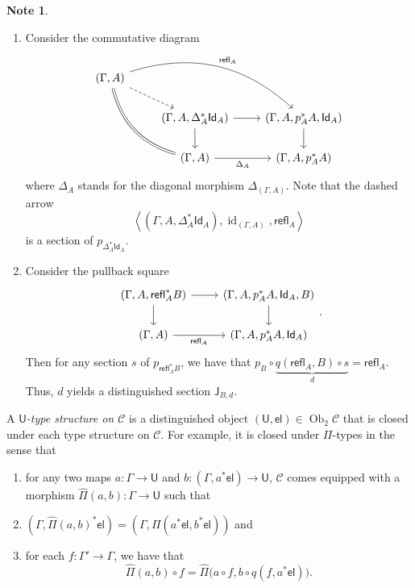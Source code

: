 \documentclass[10pt,letterpaper,cm]{nupset}
\theoremstyle{definition}
\newtheorem{note}[definition]{Note}
\theoremstyle{theorem}
\theoremstyle{remark}
\DeclareMathOperator{\ob}{Ob}
\newcommand{\J}{\mathsf{J}}
\newcommand{\id}{\mathsf{Id}}
\newcommand{\refl}{\mathsf{refl}}
\newcommand{\U}{\mathsf{U}}
\newcommand{\el}{\mathsf{el}}
\newcommand{\0}{\mathbf{0}}
\newcommand{\1}{\mathbf{1}}
\newcommand{\2}{\mathbf{2}}
\renewcommand{\c}{\mathscr{C}}
\DeclareMathOperator{\idd}{id}
\newcommand{\be}{\begin{enumerate}}
\newcommand{\ee}{\end{enumerate}}
\begin{document}
\begin{note} $ $
\be
\item Consider the commutative diagram
\[
\begin{tikzcd}
{\left(\Gamma, A\right)} \arrow[rdd, bend right, equal] \arrow[rrd, "\refl_A", bend left] \arrow[rd, dashed] &                                                                      &                                                          \\
                                                                                                      & {\left(\Gamma, A, \Delta_A^{\ast}{\id_A}\right)} \arrow[d] \arrow[r] & {\left(\Gamma, A, p_A^{\ast}{A}, \id_A\right)} \arrow[d] \\
                                                                                                      & {\left(\Gamma, A\right)} \arrow[r, "\Delta_A"']                      & {\left(\Gamma, A, p_A^{\ast}{A}\right)}                 
\end{tikzcd}
\] where $\Delta_A$ stands for the diagonal morphism $\Delta_{\left(\Gamma, A\right)}$. Note that the dashed arrow $$\left\langle \left(\Gamma, A, \Delta_A^{\ast}{\id_A}\right), \idd_{\left(\Gamma, A\right)}, \refl_A\right\rangle$$ is a section of $p_{\Delta_A^{\ast}{\id_A}}$. 

\item Consider the pullback square
\[
\begin{tikzcd}
{\left(\Gamma, A, \refl_A^{\ast}{B}\right)} \arrow[d] \arrow[r] & {\left(\Gamma, A, p_A^{\ast}{A}, \id_A, B\right)} \arrow[d] \\
{\left(\Gamma, A\right)} \arrow[r, "\refl_A"']           & {\left(\Gamma, A, p_A^{\ast}{A}, \id_A\right)}             
\end{tikzcd}.
\] Then for any section $s$ of $p_{ \refl_A^{\ast}{B}}$, we have that $p_B \circ \underbrace{q(\refl_A, B) \circ s}_{d} = \refl_A$. Thus, $d$ yields a distinguished section $\J_{B, d}$.  
\ee
\end{note}

\medskip

A \textit{$\U$-type structure on $\c$} is a distinguished object $\left(\U, \el\right) \in \ob_{2}{\c}$ that is closed under each type structure on $\c$. For example, it is closed under $\Pi$-types in the sense that
\be[label=(\roman*)]
\item  for any two maps $a: \Gamma \to \U$ and $b: \left(\Gamma, a^{\ast}{\el}\right) \to \U$, $\c$ comes equipped with a morphism $\hat{\Pi}(a,b): \Gamma \to \U$ such that 
\item $\left(\Gamma, \hat{\Pi}(a,b)^{\ast}{\el}\right) = \left(\Gamma, \Pi(a^{\ast}{\el}, b^{\ast}{\el})\right)$ and
\item for each $f: \Gamma' \to \Gamma$, we have that 
$$\hat{\Pi}(a,b) \circ f
= 
\hat{\Pi}\big(a\circ f, b \circ q(f, a^{\ast}{\el})\big).$$
\ee
\end{document}
